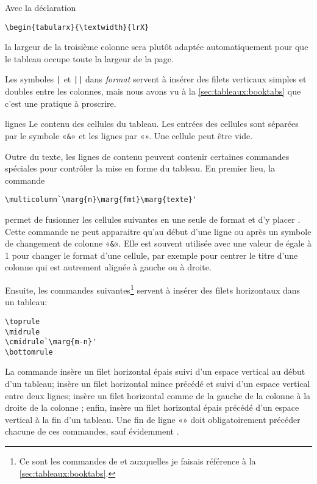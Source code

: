 \begin{list}{}
  Avec la déclaration
\begin{lstlisting}
\begin{tabularx}{\textwidth}{lrX}
\end{lstlisting}
  la largeur de la troisième colonne sera plutôt adaptée
  automatiquement pour que le tableau occupe toute la largeur de la
  page.

  Les symboles \verb=|= et \verb=||= dans \textit{format} servent à
  insérer des filets verticaux simples et doubles entre les colonnes,
  mais nous avons vu à la \autoref{sec:tableaux:booktabs} que c'est
  une pratique à proscrire.
\item[lignes] Le contenu des cellules du tableau. Les entrées des
  cellules sont séparées par le symbole «\verb=&=» et les lignes par
  «\pixbsbs». Une cellule peut être vide.
\end{list}

Outre du texte, les lignes de contenu peuvent contenir certaines
commandes spéciales pour contrôler la mise en forme du tableau. En
premier lieu, la commande
\begin{lstlisting}
\multicolumn`\marg{n}\marg{fmt}\marg{texte}'
\end{lstlisting}
permet de fusionner les  cellules suivantes en une seule de
format  et d'y placer . Cette commande ne peut
apparaitre qu'au début d'une ligne ou après un symbole de changement
de colonne «\verb=&=». Elle est souvent utilisée avec une valeur de
 égale à 1 pour changer le format d'une cellule, par exemple
pour centrer le titre d'une colonne qui est autrement alignée à gauche
ou à droite.

Ensuite, les commandes suivantes\footnote{%
  Ce sont les commandes de  et  auxquelles
  je faisais référence à la \autoref{sec:tableaux:booktabs}.} %
servent à insérer des filets horizontaux dans un tableau:
\begin{lstlisting}
\toprule
\midrule
\cmidrule`\marg{m-n}'
\bottomrule
\end{lstlisting}
La commande \cmd{\toprule} insère un filet horizontal épais suivi d'un
espace vertical au début d'un tableau; \cmd{\midrule} insère un filet
horizontal mince précédé et suivi d'un espace vertical entre deux
lignes; \cmd{\cmidrule} insère un filet horizontal comme
\cmdprint{\midrule} de la gauche de la colonne  à la droite de
la colonne ; enfin, \cmd{\bottomrule} insère un filet
horizontal épais précédé d'un espace vertical à la fin d'un tableau.
Une fin de ligne «\pixbsbs» doit obligatoirement précéder chacune de ces
commandes, sauf évidemment \cmdprint{\toprule}.

